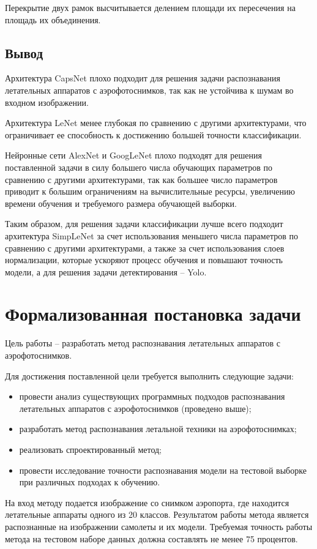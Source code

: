Перекрытие двух рамок высчитывается делением площади их пересечения на площадь их объединения.


\subsection{Вывод}
Архитектура CapsNet плохо подходит для решения задачи распознавания летательных аппаратов с аэрофотоснимков, так как не устойчива к шумам во входном изображении.

Архитектура LeNet менее глубокая по сравнению с другими архитектурами, что ограничивает ее способность к достижению большей точности классификации.

Нейронные сети AlexNet и GoogLeNet плохо подходят для решения поставленной задачи в силу большего числа обучающих параметров по сравнению с другими архитектурами, так как большее число параметров приводит к большим ограничениям на вычислительные ресурсы, увеличению времени обучения и требуемого размера обучающей выборки.

Таким образом, для решения задачи классификации лучше всего подходит архитектура SimpLeNet за счет использования меньшего числа параметров по сравнению с другими архитектурами, а также за счет использования слоев нормализации, которые ускоряют процесс обучения и повышают точность модели, а для решения задачи детектирования -- Yolo.

\section{Формализованная постановка задачи}
Цель работы -- разработать метод распознавания летательных аппаратов с аэрофотоснимков.

Для достижения поставленной цели требуется выполнить следующие задачи:
\begin{itemize}
	\item провести анализ существующих программных подходов распознавания летательных аппаратов с аэрофотоснимков (проведено выше);
	\item разработать метод распознавания летальной техники на аэрофотоснимках;
	\item реализовать спроектированный метод;
	\item провести исследование точности распознавания модели на тестовой выборке при различных подходах к обучению.
\end{itemize}

На вход методу подается изображение со снимком аэропорта, где находится летательные аппараты одного из 20 классов. Результатом работы метода является распознанные на изображении самолеты и их модели. Требуемая точность работы метода на тестовом наборе данных должна составлять не менее 75 процентов.

